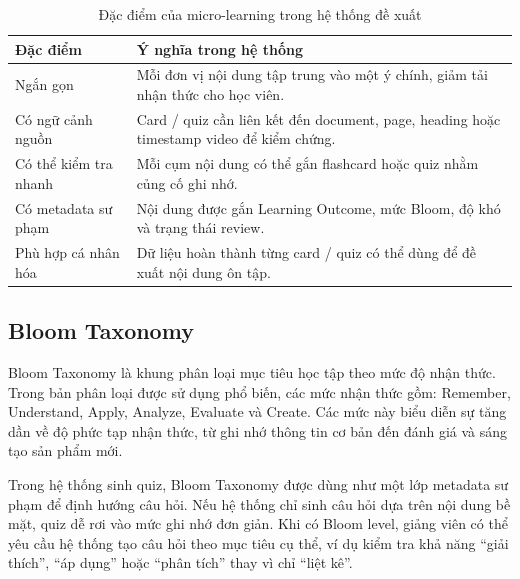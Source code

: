 \begin{table}[H]
    \centering
    \caption{Đặc điểm của micro-learning trong hệ thống đề xuất}
    \label{tab:microlearning-characteristics}
    \begin{tabular}{p{4cm}p{9.5cm}}
        \toprule
        \textbf{Đặc điểm} & \textbf{Ý nghĩa trong hệ thống} \\
        \midrule
        Ngắn gọn & Mỗi đơn vị nội dung tập trung vào một ý chính, giảm tải nhận thức cho học viên. \\
        Có ngữ cảnh nguồn & Card / quiz cần liên kết đến document, page, heading hoặc timestamp video để kiểm chứng. \\
        Có thể kiểm tra nhanh & Mỗi cụm nội dung có thể gắn flashcard hoặc quiz nhằm củng cố ghi nhớ. \\
        Có metadata sư phạm & Nội dung được gắn Learning Outcome, mức Bloom, độ khó và trạng thái review. \\
        Phù hợp cá nhân hóa & Dữ liệu hoàn thành từng card / quiz có thể dùng để đề xuất nội dung ôn tập. \\
        \bottomrule
    \end{tabular}
\end{table}

\subsection{Bloom Taxonomy}
\label{subsec:bloom-taxonomy}

Bloom Taxonomy là khung phân loại mục tiêu học tập theo mức độ nhận thức. Trong
bản phân loại được sử dụng phổ biến, các mức nhận thức gồm: Remember,
Understand, Apply, Analyze, Evaluate và Create. Các mức này biểu diễn sự tăng
dần về độ phức tạp nhận thức, từ ghi nhớ thông tin cơ bản đến đánh giá và sáng
tạo sản phẩm mới.

Trong hệ thống sinh quiz, Bloom Taxonomy được dùng như một lớp metadata sư
phạm để định hướng câu hỏi. Nếu hệ thống chỉ sinh câu hỏi dựa trên nội dung bề
mặt, quiz dễ rơi vào mức ghi nhớ đơn giản. Khi có Bloom level, giảng viên có
thể yêu cầu hệ thống tạo câu hỏi theo mục tiêu cụ thể, ví dụ kiểm tra khả năng
``giải thích'', ``áp dụng'' hoặc ``phân tích'' thay vì chỉ ``liệt kê''.

